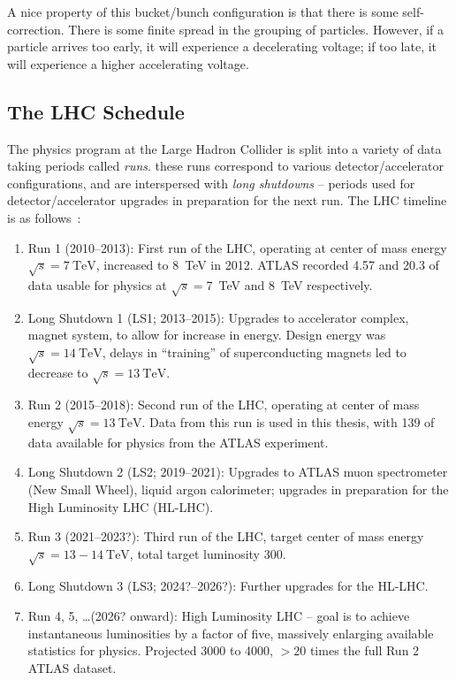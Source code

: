 A nice property of this bucket/bunch configuration is that there is some self-correction. There is 
some finite spread in the grouping of particles. However, if a particle arrives too early, it will experience a 
decelerating voltage; if too late, it will experience a higher accelerating voltage.

\subsection{The LHC Schedule}
The physics program at the Large Hadron Collider is split into a variety of data taking periods called \emph{runs}.
these runs correspond to various detector/accelerator configurations, and are interspersed with \emph{long shutdowns} -- 
periods used for detector/accelerator upgrades in preparation for the next run. The LHC timeline is as 
follows~\cite{ATLASupgrade-phase2,HiLumi}:
\begin{enumerate}
	\item Run 1 (2010--2013): First run of the LHC, operating at center of mass energy $\sqrt{s}=\SI{7}{\TeV}$, 
	increased to \SI{8}{\TeV} in 2012. ATLAS recorded \SI{4.57}{\ifb} and \SI{20.3}{\ifb} of data usable for physics
	at $\sqrt{s}=$\SI{7}{\TeV} and \SI{8}{\TeV} respectively.
	\item Long Shutdown 1 (LS1; 2013--2015): Upgrades to accelerator complex, magnet system, to allow for increase 
	in energy. Design energy was $\sqrt{s}=\SI{14}{\TeV}$, delays in ``training'' of superconducting magnets 
	led to decrease to $\sqrt{s}=\SI{13}{\TeV}$.
	\item Run 2 (2015--2018): Second run of the LHC, operating at center of mass energy $\sqrt{s}=\SI{13}{\TeV}$. 
	Data from this run is used in this thesis, with \SI{139}{\ifb} of data available for physics from the ATLAS
	experiment.
	\item Long Shutdown 2 (LS2; 2019--2021): Upgrades to ATLAS muon spectrometer (New Small Wheel), liquid argon 
	calorimeter; upgrades in preparation for the High Luminosity LHC (HL-LHC).
	\item Run 3 (2021--2023?): Third run of the LHC, target center of mass energy $\sqrt{s}=13-\SI{14}{\TeV}$, 
	total target luminosity \SI{300}{\ifb}.
	\item Long Shutdown 3 (LS3; 2024?--2026?): Further upgrades for the HL-LHC.
	\item Run 4, 5, \ldots (2026? onward): High Luminosity LHC -- goal is to achieve instantaneous luminosities 
	by a factor of five, massively enlarging available statistics for physics. Projected 3000 to \SI{4000}{\ifb}, 
	$> 20$ times the full Run 2 ATLAS dataset.
\end{enumerate}



